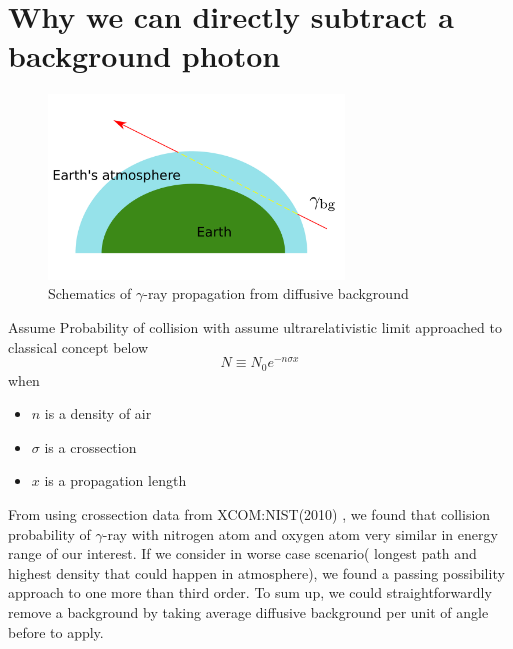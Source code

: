 \chapter{Why we can directly subtract a background photon}\label{backgroundSubtract}

\begin{figure}[h!]
    \centering
      \includegraphics[width=0.7\textwidth]{img/backgroundSubtract}
      \caption{Schematics of $\gamma$-ray propagation from diffusive background}
\end{figure}

Assume Probability of collision with assume ultrarelativistic limit approached to classical concept below
\begin{equation}
    N \equiv N_0 e^{-n\sigma x}
\end{equation}
when
\begin{itemize}
    \item $n$ is a density of air
    \item $\sigma$ is a crossection
    \item $x$ is a propagation length
\end{itemize}
From using crossection data from XCOM:NIST(2010) \cite{XCOMNIST}, we found that collision probability of $\gamma$-ray with nitrogen atom and oxygen atom very similar in energy range of our interest.
If we consider in worse case scenario( longest path and highest density that could happen in atmosphere), we found a passing possibility approach to one more than third order. To sum up, we could straightforwardly remove a background by taking average diffusive background per unit of angle before to apply.


